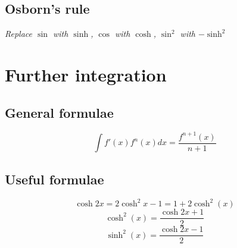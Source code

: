 \documentclass[a4paper,9pt]{scrartcl}
\DeclareMathOperator{\artanh}{artanh}
\begin{document}

    \subsection{Osborn's rule}
    \textit{Replace $\sin$ with $\sinh$, $\cos$ with $\cosh$, $\sin^2$ with $-\sinh^2$}


    \section{Further integration}

    \subsection{General formulae}

    \begin{displaymath}
        \int f'(x)f^n(x) dx = \frac{f^{n+1}(x)}{n+1}
    \end{displaymath}

    \subsection{Useful formulae}

    \begin{displaymath}
        \cosh{2x} = 2\cosh^2{x} - 1 = 1 + 2\cosh^2(x)
    \end{displaymath}
    \begin{displaymath}
        \cosh^2(x) = \frac{\cosh{2x} + 1}{2}
    \end{displaymath}
    \begin{displaymath}
        \sinh^2(x) = \frac{\cosh{2x} - 1}{2}
    \end{displaymath}
\end{document}
